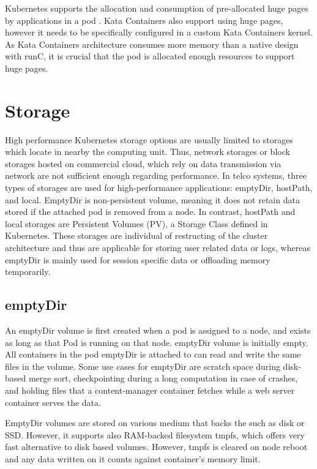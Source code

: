 Kubernetes supports the allocation and consumption of pre-allocated huge pages by applications in a pod \cite{HugePagesKubernetes}. Kata Containers also support using huge pages, however it needs to be specifically configured in a custom Kata Containers kernel. As Kata Containers architecture consumes more memory than a native design with runC, it is crucial that the pod is allocated enough resources to support huge pages.

\section{Storage}

High performance Kubernetes storage options are usually limited to storages which locate in nearby the computing unit. Thus, network storages or block storages hosted on commercial cloud, which rely on data transmission via network are not sufficient enough regarding performance. In telco systems, three types of storages are used for high-performance applications: emptyDir, hostPath, and local. EmptyDir is non-persistent volume, meaning it does not retain data stored if the attached pod is removed from a node. In contrast, hostPath and local storages are Persistent Volumes (PV), a Storage Class defined in Kubernetes. These storages are individual of restructing of the cluster architecture and thus are applicable for storing user related data or logs, whereas emptyDir is mainly used for session specific data or offloading memory temporarily.

\subsection{emptyDir}

An emptyDir volume is first created when a pod is assigned to a node, and exists as long as that Pod is running on that node. emptyDir volume is initially empty. All containers in the pod emptyDir is attached to can read and write the same files in the volume. Some use cases for emptyDir are scratch space during disk-based merge sort, checkpointing during a long computation in case of crashes, and holding files that a content-manager container fetches while a web server container serves the data. \cite{VolumesKubernetes}

EmptyDir volumes are stored on various medium that backs the such as disk or SSD. However, it supports also RAM-backed filesystem tmpfs, which offers very fast alternative to disk based volumes. However, tmpfs is cleared on node reboot and any data written on it counts against container's memory limit. \cite{VolumesKubernetes}

